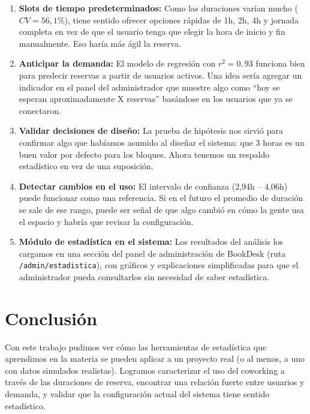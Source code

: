 \documentclass[12pt,a4paper]{article}
\begin{document}
\begin{enumerate}[itemsep=10pt]
  \item \textbf{Slots de tiempo predeterminados:} Como las duraciones varían mucho ($CV = 56{,}1\%$), tiene sentido ofrecer opciones rápidas de 1h, 2h, 4h y jornada completa en vez de que el usuario tenga que elegir la hora de inicio y fin manualmente. Eso haría más ágil la reserva.

  \item \textbf{Anticipar la demanda:} El modelo de regresión con $r^2 = 0{,}93$ funciona bien para predecir reservas a partir de usuarios activos. Una idea sería agregar un indicador en el panel del administrador que muestre algo como ``hoy se esperan aproximadamente X reservas'' basándose en los usuarios que ya se conectaron.

  \item \textbf{Validar decisiones de diseño:} La prueba de hipótesis nos sirvió para confirmar algo que habíamos asumido al diseñar el sistema: que 3 horas es un buen valor por defecto para los bloques. Ahora tenemos un respaldo estadístico en vez de una suposición.

  \item \textbf{Detectar cambios en el uso:} El intervalo de confianza (2,94h – 4,06h) puede funcionar como una referencia. Si en el futuro el promedio de duración se sale de ese rango, puede ser señal de que algo cambió en cómo la gente usa el espacio y habría que revisar la configuración.

  \item \textbf{Módulo de estadística en el sistema:} Los resultados del análisis los cargamos en una sección del panel de administración de BookDesk (ruta \texttt{/admin/estadistica}), con gráficos y explicaciones simplificadas para que el administrador pueda consultarlos sin necesidad de saber estadística.
\end{enumerate}

\section*{Conclusión}

Con este trabajo pudimos ver cómo las herramientas de estadística que aprendimos en la materia se pueden aplicar a un proyecto real (o al menos, a uno con datos simulados realistas). Logramos caracterizar el uso del coworking a través de las duraciones de reserva, encontrar una relación fuerte entre usuarios y demanda, y validar que la configuración actual del sistema tiene sentido estadístico.
\end{document}
